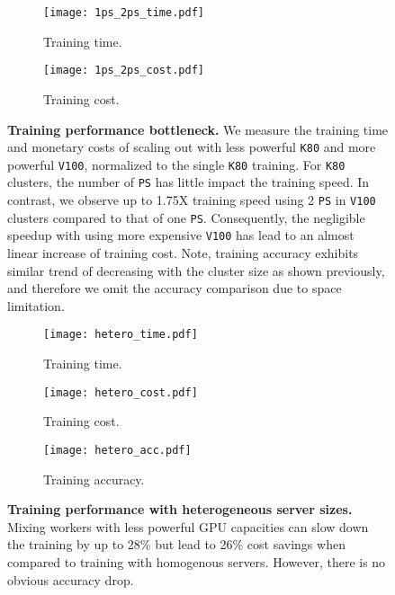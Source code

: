 \begin{figure}[t]
%
    \begin{subfigure}{0.24\textwidth}
    \centering
    \texttt{[image: 1ps\_2ps\_time.pdf]}
        \caption{Training time.}
    \label{subfig:1ps2ps_time} 
    \end{subfigure}
\hfill
    \begin{subfigure}{0.24\textwidth}
    \centering
    \texttt{[image: 1ps\_2ps\_cost.pdf]}
        \caption{Training cost.}
    \label{subfig:1ps2ps_cost} 
    \end{subfigure}
    \caption{\textbf{Training performance bottleneck.} We measure the training time and monetary costs of scaling out with less powerful \texttt{K80} and more powerful \texttt{V100}, normalized to the single \texttt{K80} training. For \texttt{K80} clusters, the number of \texttt{PS} has little impact the training speed. In contrast, we observe up to 1.75X training speed using 2 \texttt{PS} in \texttt{V100} clusters compared to that of one \texttt{PS}. Consequently, the negligible speedup with using more expensive \texttt{V100} has lead to an almost linear increase of training cost. Note, training accuracy exhibits similar trend of decreasing with the cluster size as shown previously, and therefore we omit the accuracy comparison due to space limitation.
    }
    \label{fig:1ps_2ps}
\end{figure}



\begin{figure*}[t]
%
    \begin{subfigure}{0.32\textwidth}
    \centering
    \texttt{[image: hetero\_time.pdf]}
        \caption{Training time.}
    \label{subfig:heter_time} 
    \end{subfigure}
\hfill
    \begin{subfigure}{0.32\textwidth}
    \centering
    \texttt{[image: hetero\_cost.pdf]}
        \caption{Training cost.}
    \label{subfig:heter_cost} 
    \end{subfigure}
   \hfill
    \begin{subfigure}{0.32\textwidth}
    \centering
    \texttt{[image: hetero\_acc.pdf]}
        \caption{Training accuracy.}
    \label{subfig:heter_acc} 
    \end{subfigure}
    \caption{
    \textbf{Training performance with heterogeneous server sizes.}
    Mixing workers with less powerful GPU capacities can slow down the training by up to 28\% but lead to 26\% cost savings when compared to training with homogenous servers. However, there is no obvious accuracy drop.
     }
    \label{fig:heter_train}
\end{figure*}


